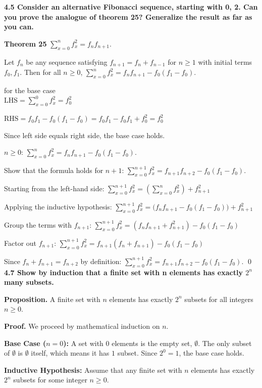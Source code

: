 \documentclass[12pt]{exam}
\begin{document}
\bf 4.5 Consider an alternative Fibonacci sequence, starting with 0, 2. Can you prove the analogue of theorem 25? Generalize the result as far as you can. 
\normalfont

\textbf{Theorem 25} 
$\sum_{x=0}^{n} f_x^2 = f_n f_{n+1}$.

Let $f_n$ be any sequence satisfying $f_{n+1} = f_n + f_{n-1}$ for $n \ge 1$ with initial terms $f_0, f_1$. Then for all $n \ge 0$,
$\sum_{x=0}^{n} f_x^2 = f_n f_{n+1} - f_0(f_1 - f_0)$.

for the base case
\\
$\text{LHS} = \sum_{x=0}^{0} f_x^2 = f_0^2$

$\text{RHS} = f_0 f_1 - f_0(f_1 - f_0) = f_0 f_1 - f_0 f_1 + f_0^2 = f_0^2$

Since left side equals right side, the base case holds.

$n \ge 0$:
$\sum_{x=0}^{n} f_x^2 = f_n f_{n+1} - f_0(f_1 - f_0)$.

Show that the formula holds for $n + 1$:
$\sum_{x=0}^{n+1} f_x^2 = f_{n+1} f_{n+2} - f_0(f_1 - f_0)$.

Starting from the left-hand side:
$\sum_{x=0}^{n+1} f_x^2 = \left( \sum_{x=0}^{n} f_x^2 \right) + f_{n+1}^2$

Applying the inductive hypothesis:
$\sum_{x=0}^{n+1} f_x^2 = \big( f_n f_{n+1} - f_0(f_1 - f_0) \big) + f_{n+1}^2$

Group the terms with $f_{n+1}$:
$\sum_{x=0}^{n+1} f_x^2 = (f_n f_{n+1} + f_{n+1}^2) - f_0(f_1 - f_0)$

Factor out $f_{n+1}$:
$\sum_{x=0}^{n+1} f_x^2 = f_{n+1}(f_n + f_{n+1}) - f_0(f_1 - f_0)$

Since $f_n + f_{n+1} = f_{n+2}$ by definition:
$\sum_{x=0}^{n+1} f_x^2 = f_{n+1} f_{n+2} - f_0(f_1 - f_0)$. \qed
\\

\bf 4.7 Show by induction that a finite set with n elements has exactly $2^n$ many subsets. 
\normalfont

\textbf{Proposition.} A finite set with $n$ elements has exactly $2^n$ subsets for all integers $n \ge 0$.

\textbf{Proof.} We proceed by mathematical induction on $n$.

\textbf{Base Case ($n = 0$):}
A set with $0$ elements is the empty set, $\emptyset$. The only subset of $\emptyset$ is $\emptyset$ itself, which means it has $1$ subset. Since $2^0 = 1$, the base case holds.

\textbf{Inductive Hypothesis:}
Assume that any finite set with $n$ elements has exactly $2^n$ subsets for some integer $n \ge 0$.
\end{document}
